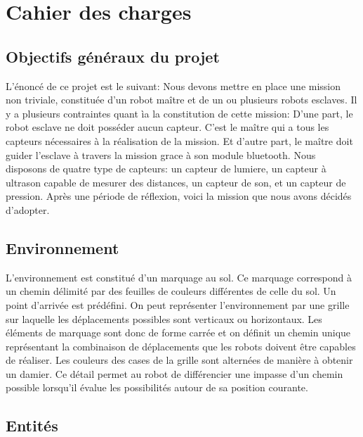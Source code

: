 \section{Cahier des charges}

  \subsection{Objectifs généraux du projet}

  L'\'{e}nonc\'{e} de ce projet est le suivant: Nous devons mettre en place une mission non triviale, constitu\'{e}e d'un robot ma\^{i}tre et de un ou plusieurs robots esclaves. Il y a plusieurs contraintes quant \`{i}a la constitution de cette mission: D'une part, le robot esclave ne doit poss\'{e}der aucun capteur. C'est le ma\^{i}tre qui a tous les capteurs n\'{e}cessaires à la réalisation de la mission. Et d'autre part, le ma\^{i}tre doit guider l'esclave \`{a} travers la mission grace à son module bluetooth. Nous disposons de quatre type de capteurs: un capteur de lumiere, un capteur à ultrason capable de mesurer des distances, un capteur de son, et un capteur de pression. Après une p\'{e}riode de r\'{e}flexion, voici la mission que nous avons d\'{e}cid\'{e}s d'adopter.

  \subsection{Environnement}
  L'environnement est constitu\'{e} d'un marquage au sol. Ce marquage
  correspond \`{a} un chemin d\'{e}limit\'{e} par des feuilles de couleurs
  diff\'{e}rentes de celle du sol. Un point d'arriv\'{e}e est pr\'{e}d\'{e}fini. On peut
  repr\'{e}senter l'environnement par une grille sur laquelle les
  d\'{e}placements possibles sont verticaux ou horizontaux. Les \'{e}l\'{e}ments de
  marquage sont donc de forme carr\'{e}e et on d\'{e}finit un chemin unique
  repr\'{e}sentant la combinaison de d\'{e}placements que les robots doivent
  \^{e}tre capables de r\'{e}aliser. Les couleurs des cases de la grille sont
  altern\'{e}es de mani\`{e}re \`{a} obtenir un damier. Ce d\'{e}tail permet au robot de
  diff\'{e}rencier une impasse d'un chemin possible lorsqu'il \'{e}value les
  possibilit\'{e}s autour de sa position courante.

  \subsection{Entit\'{e}s}

